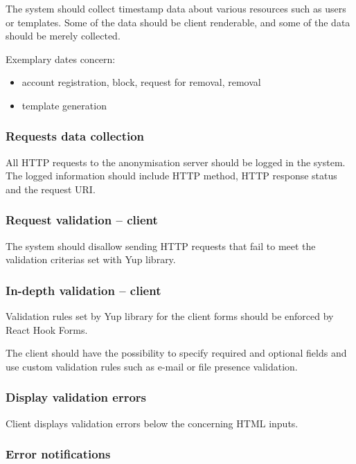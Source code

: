 \documentclass[a4paper,twoside,12pt]{book}
\begin{document}
The system should collect timestamp data about various resources such as users or templates. Some of the data should be client renderable, and some of the data should be merely collected.

Exemplary dates concern:
\begin{itemize}
\item account registration, block, request for removal, removal
\item template generation
\end{itemize}

\subsubsection{Requests data collection}

All HTTP requests to the anonymisation server should be logged in the system. The logged information should include HTTP method, HTTP response status and the request URI.	

\subsubsection{Request validation – client}

The system should disallow sending HTTP requests that fail to meet the validation criterias set with Yup library.

\subsubsection{In-depth validation – client}

Validation rules set by Yup library for the client forms should be enforced by React Hook Forms. 

The client should have the possibility to specify required and optional fields and use custom validation rules such as e-mail or file presence validation.

\subsubsection{Display validation errors}

Client displays validation errors below the concerning HTML inputs.

\subsubsection{Error notifications}
\end{document}
